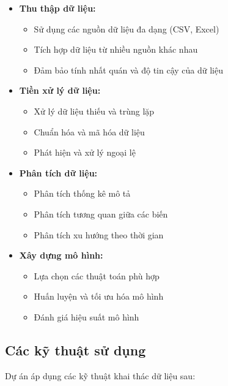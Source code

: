 \begin{itemize}
    \item \textbf{Thu thập dữ liệu:}
    \begin{itemize}
        \item Sử dụng các nguồn dữ liệu đa dạng (CSV, Excel)
        \item Tích hợp dữ liệu từ nhiều nguồn khác nhau
        \item Đảm bảo tính nhất quán và độ tin cậy của dữ liệu
    \end{itemize}
    
    \item \textbf{Tiền xử lý dữ liệu:}
    \begin{itemize}
        \item Xử lý dữ liệu thiếu và trùng lặp
        \item Chuẩn hóa và mã hóa dữ liệu
        \item Phát hiện và xử lý ngoại lệ
    \end{itemize}
    
    \item \textbf{Phân tích dữ liệu:}
    \begin{itemize}
        \item Phân tích thống kê mô tả
        \item Phân tích tương quan giữa các biến
        \item Phân tích xu hướng theo thời gian
    \end{itemize}
    
    \item \textbf{Xây dựng mô hình:}
    \begin{itemize}
        \item Lựa chọn các thuật toán phù hợp
        \item Huấn luyện và tối ưu hóa mô hình
        \item Đánh giá hiệu suất mô hình
    \end{itemize}
\end{itemize}

\subsection{Các kỹ thuật sử dụng}

\hspace{0.5cm}Dự án áp dụng các kỹ thuật khai thác dữ liệu sau:


